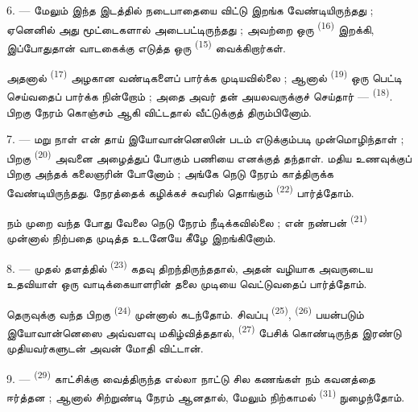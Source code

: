 6. --- மேலும் இந்த இடத்தில் நடைபாதையை விட்டு இறங்க
வேண்டியிருந்தது ; ஏனெனில் அது மூட்டைகளால் அடைபட்டிருந்தது ; அவற்றை
ஒரு  \textsuperscript{(16)}
இறக்கி, இப்போதுதான் வாடகைக்கு எடுத்த ஒரு 
\textsuperscript{(15)} வைக்கிறார்கள்.

அதனால்  \textsuperscript{(17)} அழகான
வண்டிகளைப் பார்க்க முடியவில்லை ; ஆனால் 
\textsuperscript{(19)} ஒரு பெட்டி செய்வதைப் பார்க்க நின்றோம் ; அதை
அவர் தன் அயலவருக்குச் செய்தார் —  \textsuperscript{(18)}. பிறகு நேரம் கொஞ்சம் ஆகி
விட்டதால் வீட்டுக்குத் திரும்பினோம்.

\VUsaut{3.0mm}

7. --- மறு நாள் என் தாய் இயோவான்னெஸின் படம் எடுக்கும்படி
முன்மொழிந்தாள் ; பிறகு 
\textsuperscript{(20)} அவனை அழைத்துப் போகும் பணியை எனக்குத் தந்தாள்.
மதிய உணவுக்குப் பிறகு அந்தக் கலைஞரின் 
போனோம் ; அங்கே நெடு நேரம் காத்திருக்க வேண்டியிருந்தது. நேரத்தைக்
கழிக்கச் சுவரில் தொங்கும் 
\textsuperscript{(22)} பார்த்தோம்.

நம் முறை வந்த போது வேலை நெடு நேரம் நீடிக்கவில்லை ; என் நண்பன்
 \textsuperscript{(21)} முன்னால் நிற்பதை
முடித்த உடனேயே கீழே இறங்கினோம்.

8. --- முதல் தளத்தில் 
\textsuperscript{(23)} கதவு திறந்திருந்ததால், அதன் வழியாக அவருடைய
உதவியாள் ஒரு வாடிக்கையாளரின் தலை முடியை வெட்டுவதைப் பார்த்தோம்.

தெருவுக்கு வந்த பிறகு 
\textsuperscript{(24)} முன்னால் கடந்தோம். சிவப்பு 
\textsuperscript{(25)},  \textsuperscript{(26)}
பயன்படும்  இயோவான்னெஸை அவ்வளவு
மகிழ்வித்ததால்,  \textsuperscript{(27)}
பேசிக் கொண்டிருந்த இரண்டு முதியவர்களுடன் அவன் மோதி விட்டான்.

\VUsaut{3.0mm}

9. ---  \textsuperscript{(29)}
 காட்சிக்கு வைத்திருந்த எல்லா நாட்டு
  சில கணங்கள் நம்
கவனத்தை ஈர்த்தன ; ஆனால் சிற்றுண்டி நேரம் ஆனதால், மேலும் நிற்காமல்
 \textsuperscript{(31)} நுழைந்தோம்.

